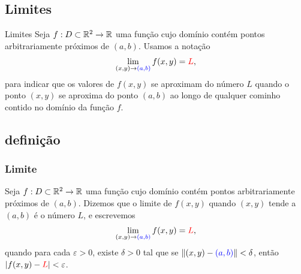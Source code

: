 \subsection*{Limites}
\begin{frame}[label=limites]{Limites}
Seja $f:D\subset\mathbb{R}^2\to \mathbb{R}$ uma função cujo domínio contém pontos arbitrariamente próximos de {\color{blue}$(a,b)$}. Usamos a notação 
	\[\lim_{(x,y)\to {\color{blue}(a,b)}}f(x,y)={\color{red}L},\]
	para indicar que os valores de $f(x,y)$ se aproximam do número {\color{red}$L$} quando o ponto $(x,y)$ se aproxima do ponto {\color{blue}$(a,b)$} ao longo de qualquer cominho contido no domínio da função $f$.
\end{frame}

\subsection*{definição}
\begin{frame}[label=limites]
	\frametitle{Limite}
		
		\begin{defin} Seja $f:D\subset\mathbb{R}^2\to \mathbb{R}$ uma função cujo domínio contém pontos arbitrariamente próximos de {\color{blue}$(a,b)$}. Dizemos que {\color{blue} o limite de $f(x,y)$ quando $(x,y)$ tende a $(a,b)$} é o número {\color{blue}$L$}, e escrevemos
				\[\lim_{(x,y)\to {\color{blue}(a,b)}}f(x,y)={\color{red}L},\]
				quando para cada $\varepsilon>0$, existe $\delta>0$ tal que se $\|(x,y)-{\color{blue}(a,b)}\|<\delta$, então $|f(x,y)-{\color{red}L}|<\varepsilon$.
		\end{defin} 

\end{frame}

